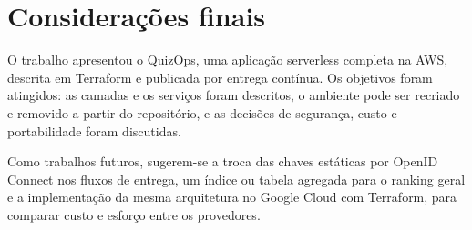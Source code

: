 \documentclass[article, 12pt, oneside, a4paper, english, brazil, sumario=tradicional]{abntex2}
\begin{document}
\section{Considerações finais}\label{sec:conclusao}

O trabalho apresentou o QuizOps, uma aplicação serverless completa na AWS, descrita em Terraform e publicada por entrega contínua. Os objetivos foram atingidos: as camadas e os serviços foram descritos, o ambiente pode ser recriado e removido a partir do repositório, e as decisões de segurança, custo e portabilidade foram discutidas.

Como trabalhos futuros, sugerem-se a troca das chaves estáticas por OpenID Connect nos fluxos de entrega, um índice ou tabela agregada para o ranking geral e a implementação da mesma arquitetura no Google Cloud com Terraform, para comparar custo e esforço entre os provedores.


\end{document}
